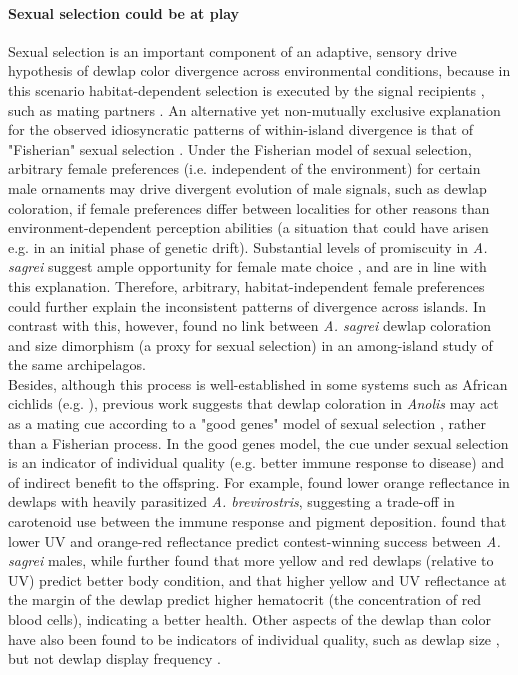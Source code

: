 \paragraph{Sexual selection could be at play} Sexual selection is an important component of an adaptive, sensory drive hypothesis of dewlap color divergence across environmental conditions, because in this scenario habitat-dependent selection is executed by the signal recipients \citep{Endler1988}, such as mating partners \citep{Driessens2014}. An alternative yet non-mutually exclusive explanation for the observed idiosyncratic patterns of within-island divergence is that of "Fisherian" sexual selection \citep{Andersson1994}. Under the Fisherian model of sexual selection, arbitrary female preferences (i.e. independent of the environment) for certain male ornaments may drive divergent evolution of male signals, such as dewlap coloration, if female preferences differ between localities for other reasons than environment-dependent perception abilities (a situation that could have arisen e.g. in an initial phase of genetic drift). Substantial levels of promiscuity in \textit{A. sagrei} suggest ample opportunity for female mate choice \citep{Kamath2018}, and are in line with this explanation. Therefore, arbitrary, habitat-independent female preferences could further explain the inconsistent patterns of divergence across islands. In contrast with this, however, \citet{Baeckens2018} found no link between \textit{A. sagrei} dewlap coloration and size dimorphism (a proxy for sexual selection) in an among-island study of the same archipelagos.\\

Besides, although this process is well-established in some systems such as African cichlids (e.g. \citealt{Seehausen1997}), previous work suggests that dewlap coloration in \textit{Anolis} may act as a mating cue according to a "good genes" model of sexual selection \citep{Andersson1994}, rather than a Fisherian process. In the good genes model, the cue under sexual selection is an indicator of individual quality (e.g. better immune response to disease) and of indirect benefit to the offspring. For example, \citet{Cook2013} found lower orange reflectance in dewlaps with heavily parasitized \textit{A. brevirostris}, suggesting a trade-off in carotenoid use between the immune response and pigment deposition. \citet{Steffen2014} found that lower UV and orange-red reflectance predict contest-winning success between \textit{A. sagrei} males, while \citet{Driessens2015} further found that more yellow and red dewlaps (relative to UV) predict better body condition, and that higher yellow and UV reflectance at the margin of the dewlap predict higher hematocrit (the concentration of red blood cells), indicating a better health. Other aspects of the dewlap than color have also been found to be indicators of individual quality, such as dewlap size \citep{Vanhooydonck2005, Vanhooydonck2009}, but not dewlap display frequency \citep{Tokarz2002, Tokarz2005, Driessens2015}.\\


